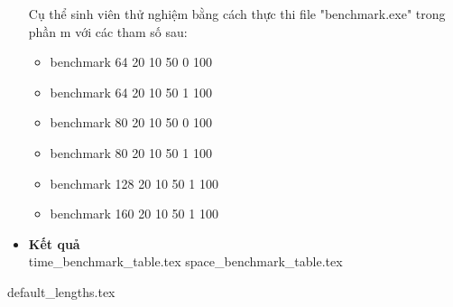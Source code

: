 \documentclass[class=report, crop=false]{standalone}
\begin{document}
\begin{itemize}
			Cụ thể sinh viên thử nghiệm bằng cách thực thi file "benchmark.exe" trong phần m với các tham số sau:
			\begin{itemize}
				\ttfamily
				\item[] benchmark 64 20 10 50 0 100
				\item[] benchmark 64 20 10 50 1 100
				\item[] benchmark 80 20 10 50 0 100
				\item[] benchmark 80 20 10 50 1 100
				\item[] benchmark 128 20 10 50 1 100
				\item[] benchmark 160 20 10 50 1 100
			\end{itemize}
			\newpage
			\item[] {\sffamily\bfseries Kết quả} \\
			{time_benchmark_table.tex}
			\newpage
			{space_benchmark_table.tex}

		\end{itemize}
	

	\newpage
	{default_lengths.tex}
\end{document}
